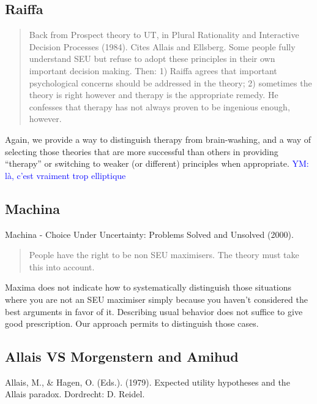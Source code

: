 \documentclass[preprint, french, english, 11pt, authoryear]{elsarticle}%
\newcommand{\commentYM}[1]{\textcolor{blue}{YM: #1}}
\begin{document}
\subsection{Raiffa}
\begin{quote}
Back from Prospect theory to UT, in Plural Rationality and Interactive Decision Processes (1984). Cites Allais and Ellsberg. Some people fully understand SEU but refuse to adopt these principles in their own important decision making. Then: 1) Raiffa agrees that important psychological concerns should be addressed in the theory; 2) sometimes the theory is right however and therapy is the appropriate remedy. He confesses that therapy has not always proven to be ingenious enough, however.
\end{quote}

Again, we provide a way to distinguish therapy from brain-washing, and a way of selecting those theories that are more successful than others in providing “therapy” or switching to weaker (or different) principles when appropriate.
\commentYM{là, c'est vraiment trop elliptique}

\subsection{Machina}
Machina - Choice Under Uncertainty: Problems Solved and Unsolved (2000).

\begin{quote}
	People have the right to be non SEU maximisers. The theory must take this into account.
\end{quote}

Maxima does not indicate how to systematically distinguish those situations where you are not an SEU maximiser simply because you haven’t considered the best arguments in favor of it. Describing usual behavior does not suffice to give good prescription. Our approach permits to distinguish those cases.

\subsection{Allais VS Morgenstern and Amihud}
Allais, M., \& Hagen, O. (Eds.). (1979). Expected utility hypotheses and the Allais paradox. Dordrecht: D. Reidel.
\end{document}
